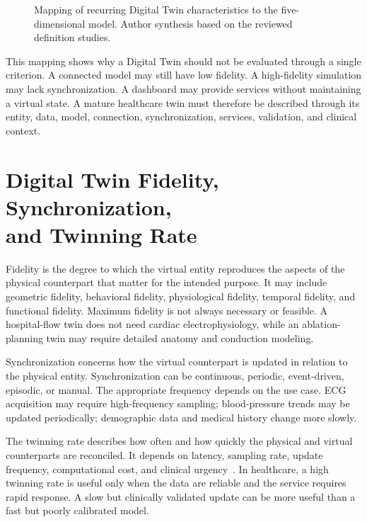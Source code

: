 \begin{figure}[H]
    \centering
    \resizebox{\textwidth}{!}{}
    \caption{Mapping of recurring Digital Twin characteristics to the five-dimensional model. Author synthesis based on the reviewed definition studies.}
    \label{fig:dt_characteristics_mapping}
\end{figure}

This mapping shows why a Digital Twin should not be evaluated through a single criterion. A connected model may still have low fidelity. A high-fidelity simulation may lack synchronization. A dashboard may provide services without maintaining a virtual state. A mature healthcare twin must therefore be described through its entity, data, model, connection, synchronization, services, validation, and clinical context.

\section[Digital Twin Fidelity, Synchronization, and Twinning Rate]{\texorpdfstring{Digital Twin Fidelity, Synchronization,\\and Twinning Rate}{Digital Twin Fidelity, Synchronization, and Twinning Rate}}
Fidelity is the degree to which the virtual entity reproduces the aspects of the physical counterpart that matter for the intended purpose. It may include geometric fidelity, behavioral fidelity, physiological fidelity, temporal fidelity, and functional fidelity. Maximum fidelity is not always necessary or feasible. A hospital-flow twin does not need cardiac electrophysiology, while an ablation-planning twin may require detailed anatomy and conduction modeling.

Synchronization concerns how the virtual counterpart is updated in relation to the physical entity. Synchronization can be continuous, periodic, event-driven, episodic, or manual. The appropriate frequency depends on the use case. ECG acquisition may require high-frequency sampling; blood-pressure trends may be updated periodically; demographic data and medical history change more slowly.

The twinning rate describes how often and how quickly the physical and virtual counterparts are reconciled. It depends on latency, sampling rate, update frequency, computational cost, and clinical urgency~\cite{jones2020characterising,vanderValk2020taxonomy}. In healthcare, a high twinning rate is useful only when the data are reliable and the service requires rapid response. A slow but clinically validated update can be more useful than a fast but poorly calibrated model.

